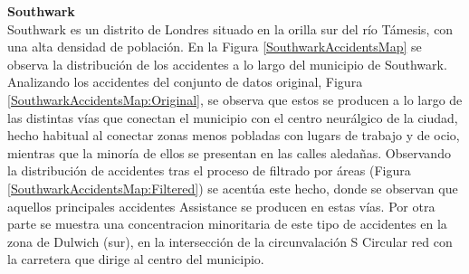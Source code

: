 \documentclass{uathesis-es}
\begin{document}
\textbf{Southwark}\\

Southwark es un distrito de Londres situado en la orilla sur del río Támesis, con una alta densidad de población. En la Figura \ref{SouthwarkAccidentsMap} se observa la distribución de los accidentes a lo largo del municipio de Southwark. Analizando los accidentes del conjunto de datos original, Figura \ref{SouthwarkAccidentsMap:Original}, se observa que estos se producen a lo largo de las distintas vías que conectan el municipio con el centro neurálgico de la ciudad, hecho habitual al conectar zonas menos pobladas con lugars de trabajo y de ocio, mientras que la minoría de ellos se presentan en las calles aledañas. Observando la distribución de accidentes tras el proceso de filtrado por áreas (Figura \ref{SouthwarkAccidentsMap:Filtered}) se acentúa este hecho, donde se observan que aquellos principales accidentes Assistance se producen en estas vías. Por otra parte se muestra una concentracion minoritaria de este tipo de accidentes en la zona de Dulwich (sur), en la intersección de la circunvalación S Circular red con la carretera que dirige al centro del municipio.
\end{document}
